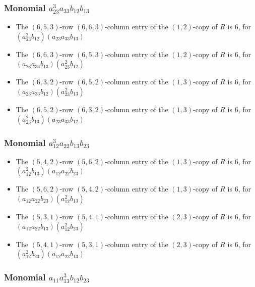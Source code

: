 \documentclass{article}
\begin{document}
\subsubsection{Monomial $ a_{23}^{3} a_{33} b_{12} b_{13} $}

\begin{itemize}
\item The $(6, 5, 3)$-row $(6, 6, 3)$-column entry of the $ \left(1, 2\right) $-copy of $R$ is $ 6 $, for $( a_{23}^{2} b_{12} )( a_{23} a_{33} b_{13} )$ 
\item The $(6, 6, 3)$-row $(6, 5, 3)$-column entry of the $ \left(1, 2\right) $-copy of $R$ is $ 6 $, for $( a_{23} a_{33} b_{13} )( a_{23}^{2} b_{12} )$ 
\item The $(6, 3, 2)$-row $(6, 5, 2)$-column entry of the $ \left(1, 3\right) $-copy of $R$ is $ 6 $, for $( a_{23} a_{33} b_{12} )( a_{23}^{2} b_{13} )$ 
\item The $(6, 5, 2)$-row $(6, 3, 2)$-column entry of the $ \left(1, 3\right) $-copy of $R$ is $ 6 $, for $( a_{23}^{2} b_{13} )( a_{23} a_{33} b_{12} )$ 
\end{itemize}
\subsubsection{Monomial $ a_{12}^{3} a_{22} b_{13} b_{23} $}

\begin{itemize}
\item The $(5, 4, 2)$-row $(5, 6, 2)$-column entry of the $ \left(1, 3\right) $-copy of $R$ is $ 6 $, for $( a_{12}^{2} b_{13} )( a_{12} a_{22} b_{23} )$ 
\item The $(5, 6, 2)$-row $(5, 4, 2)$-column entry of the $ \left(1, 3\right) $-copy of $R$ is $ 6 $, for $( a_{12} a_{22} b_{23} )( a_{12}^{2} b_{13} )$ 
\item The $(5, 3, 1)$-row $(5, 4, 1)$-column entry of the $ \left(2, 3\right) $-copy of $R$ is $ 6 $, for $( a_{12} a_{22} b_{13} )( a_{12}^{2} b_{23} )$ 
\item The $(5, 4, 1)$-row $(5, 3, 1)$-column entry of the $ \left(2, 3\right) $-copy of $R$ is $ 6 $, for $( a_{12}^{2} b_{23} )( a_{12} a_{22} b_{13} )$ 
\end{itemize}
\subsubsection{Monomial $ a_{11} a_{13}^{3} b_{12} b_{23} $}
\end{document}
